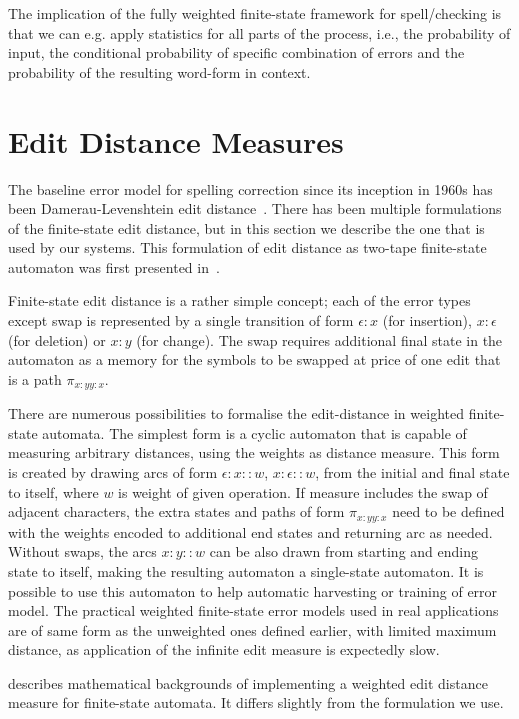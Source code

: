 \documentclass[officiallayout]{unihelcompling}
\begin{document}
The implication of the fully weighted finite-state framework for spell\-/checking
is that we can e.g. apply statistics for all parts of the process, i.e.,
the probability of input, the conditional probability of specific
combination of errors and the probability of the resulting word-form in 
context. 

\section{Edit Distance Measures}
\label{sec:edit-distance}

The baseline error model for spelling correction since its inception in 1960s
has been Damerau-Levenshtein edit
distance~\citep{damerau1964technique,levenshtein1966binary}. There has been
multiple formulations of the finite-state edit distance, but in this section
we describe the one that is used by our systems. This formulation of
edit distance as two-tape finite-state automaton was first presented 
in~\citet{schulz2002fast}.

Finite-state edit distance is a rather simple concept; each of the error types
except swap is represented by a single transition of form $\epsilon:x$ (for
insertion), $x:\epsilon$ (for deletion) or $x:y$ (for change). The swap
requires additional final state in the automaton as a memory for the symbols to
be swapped at price of one edit that is a path $\pi_{x:y y:x}$.

There are numerous possibilities to formalise the edit-distance in weighted
finite-state automata. The simplest form is a cyclic automaton that is
capable of measuring arbitrary distances, using the weights as distance 
measure. This form is created by drawing arcs of form $\epsilon:x::w$,
$x:\epsilon::w$, from the initial and final state to itself, 
where $w$ is weight of given operation. If measure includes the swap of 
adjacent characters, the extra states and paths of form $\pi_{x:y y:x}$ need to
be defined with the weights encoded to additional end states and returning arc
as needed. Without swaps, the arcs $x:y::w$ can be also drawn from starting
and ending state to itself, making the resulting automaton a single-state
automaton. It is possible to use this automaton to help automatic harvesting
or training of error model. The practical weighted finite-state error models
used in real applications are of same form as the unweighted ones defined
earlier, with limited maximum distance, as application of the infinite edit
measure is expectedly slow.

\citet{mohri2003edit} describes mathematical backgrounds of
implementing a weighted edit distance measure for finite-state automata. It
differs slightly from the formulation we use.
\end{document}
